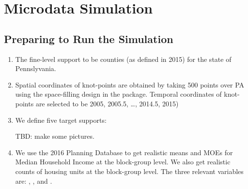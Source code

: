 \documentclass[12pt]{article}
\begin{document}
\section{Microdata Simulation}

\subsection{Preparing to Run the Simulation}
\label{sec:sim-prep}

\begin{enumerate}
\item The fine-level support to be counties (as defined in 2015) for the state of Pennslyvania.

\item Spatial coordinates of knot-points are obtained by taking 500 points over PA using the space-filling design in the  package. Temporal coordinates of knot-points are selected to be 2005, 2005.5, \ldots, 2014.5, 2015)

\item We define five target supports:
%
TBD: make some pictures.

\item We use the 2016 Planning Database to get realistic means and MOEs for Median Household Income at the block-group level. We also get realistic counts of housing units at the block-group level. The three relevant variables are: , , and .


\end{enumerate}
\end{document}
